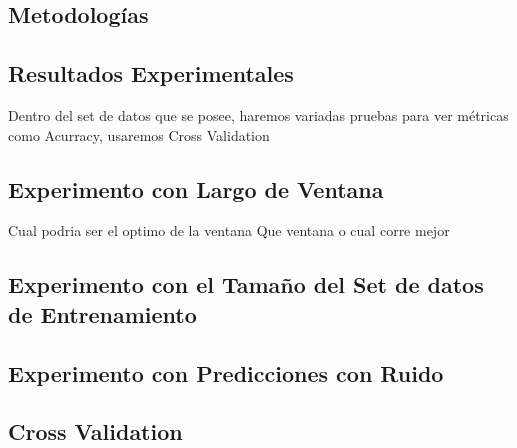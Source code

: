 


\subsection{Metodologías}








\subsection{Resultados Experimentales}


Dentro del set de datos que se posee, haremos variadas pruebas para ver métricas como Acurracy, usaremos Cross Validation 




\subsection{Experimento con Largo de Ventana}

	Cual podria ser el optimo de la ventana
	Que ventana o cual corre mejor



\subsection{Experimento con el Tamaño del Set de datos de Entrenamiento}


\subsection{Experimento con Predicciones con Ruido}

\subsection{Cross Validation}


